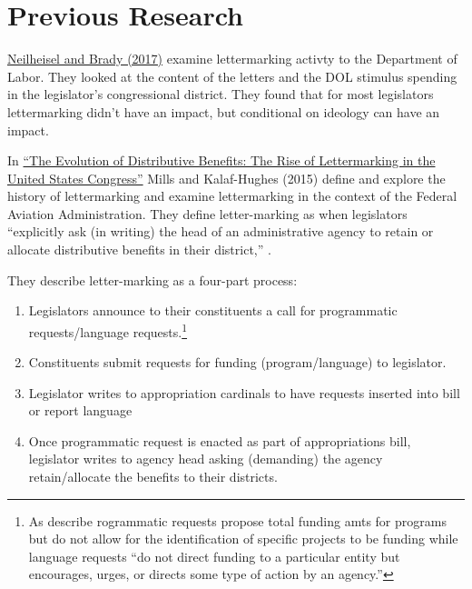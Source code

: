 \documentclass{article}
\begin{document}
\section{Previous Research}

\href{https://doi.org/10.1177/2053168017727201}{Neilheisel and Brady (2017)} examine lettermarking activty to the Department of Labor. They looked at the content of the letters and the DOL stimulus spending in the legislator's congressional district. They found that for most legislators lettermarking didn't have an impact, but conditional on ideology can have an impact.  

In \href{https://collected.jcu.edu/cgi/viewcontent.cgi?article=1002&context=jep}{``The Evolution of Distributive Benefits: The Rise of Lettermarking in the United States Congress''} Mills and Kalaf-Hughes (2015) define and explore the history of lettermarking and examine lettermarking in the context of the Federal Aviation Administration. They define letter-marking as when legislators ``explicitly ask (in writing) the head of an administrative agency to retain or allocate distributive benefits in their district,'' \citep[pg. 37]{MillsKalafHughes2015JEP}.



They describe letter-marking as a four-part process:

\begin{enumerate}
\item Legislators announce to their constituents a call for programmatic requests/language requests.\footnote{As \citet{MillsKalafHughes2015JEP} describe rogrammatic requests  propose total funding amts for programs but do not allow for the identification of specific projects to be funding while language requests ``do not direct funding to a particular entity but encourages, urges, or directs some type of action by an agency.''}
\item Constituents submit requests for funding (program/language) to legislator.
\item Legislator writes to appropriation cardinals to have requests inserted into bill or report language
\item Once programmatic request is enacted as part of appropriations bill, legislator writes to agency head asking (demanding) the agency retain/allocate the benefits to their districts. 

\end{enumerate} 
\end{document}
